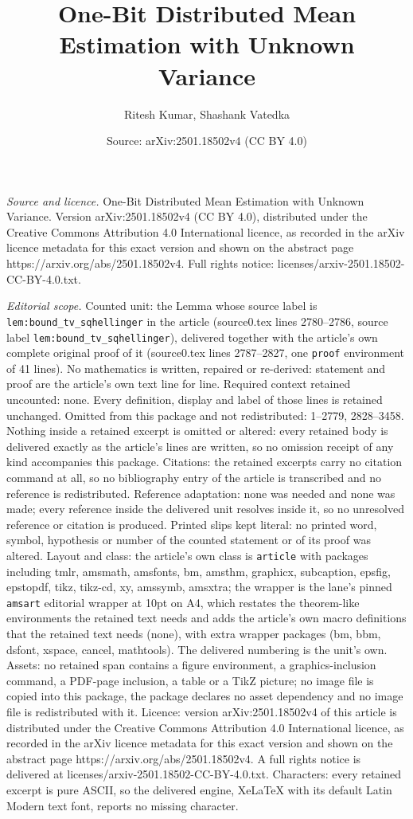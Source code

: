 \documentclass[10pt,a4paper]{amsart}
\title[One-Bit Distributed Mean Estimation with Unknown Variance]{One-Bit Distributed Mean Estimation with Unknown Variance}
\author{Ritesh Kumar, Shashank Vatedka}
\date{Source: arXiv:2501.18502v4 (CC BY 4.0)}
\begin{document}
\maketitle

\noindent\emph{Source and licence.} One-Bit Distributed Mean Estimation with Unknown Variance. Version arXiv:2501.18502v4 (CC BY 4.0), distributed under the Creative Commons Attribution 4.0 International licence, as recorded in the arXiv licence metadata for this exact version and shown on the abstract page https://arxiv.org/abs/2501.18502v4. Full rights notice: licenses/arxiv-2501.18502-CC-BY-4.0.txt.\par\smallskip

\noindent\textit{Editorial scope.} Counted unit: the Lemma whose source label is \texttt{lem:bound\_tv\_sqhellinger} in the article (source0.tex lines 2780--2786, source label \texttt{lem:bound\_tv\_sqhellinger}), delivered together with the article's own complete original proof of it (source0.tex lines 2787--2827, one \texttt{proof} environment of 41 lines). No mathematics is written, repaired or re-derived: statement and proof are the article's own text line for line. Required context retained uncounted: none. Every definition, display and label of those lines is retained unchanged. Omitted from this package and not redistributed: 1--2779, 2828--3458. Nothing inside a retained excerpt is omitted or altered: every retained body is delivered exactly as the article's lines are written, so no omission receipt of any kind accompanies this package. Citations: the retained excerpts carry no citation command at all, so no bibliography entry of the article is transcribed and no reference is redistributed. Reference adaptation: none was needed and none was made; every reference inside the delivered unit resolves inside it, so no unresolved reference or citation is produced. Printed slips kept literal: no printed word, symbol, hypothesis or number of the counted statement or of its proof was altered. Layout and class: the article's own class is \texttt{article} with packages including tmlr, amsmath, amsfonts, bm, amsthm, graphicx, subcaption, epsfig, epstopdf, tikz, tikz-cd, xy, amssymb, amsxtra; the wrapper is the lane's pinned \texttt{amsart} editorial wrapper at 10pt on A4, which restates the theorem-like environments the retained text needs and adds the article's own macro definitions that the retained text needs (none), with extra wrapper packages (bm, bbm, dsfont, xspace, cancel, mathtools). The delivered numbering is the unit's own. Assets: no retained span contains a figure environment, a graphics-inclusion command, a PDF-page inclusion, a table or a TikZ picture; no image file is copied into this package, the package declares no asset dependency and no image file is redistributed with it. Licence: version arXiv:2501.18502v4 of this article is distributed under the Creative Commons Attribution 4.0 International licence, as recorded in the arXiv licence metadata for this exact version and shown on the abstract page https://arxiv.org/abs/2501.18502v4. A full rights notice is delivered at licenses/arxiv-2501.18502-CC-BY-4.0.txt. Characters: every retained excerpt is pure ASCII, so the delivered engine, XeLaTeX with its default Latin Modern text font, reports no missing character.
\end{document}
